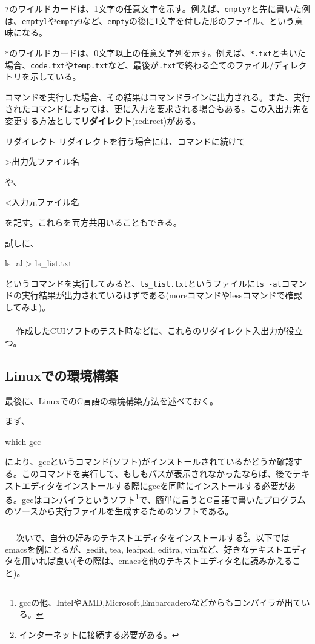 \verb|?|のワイルドカードは、1文字の任意文字を示す。例えば、\verb|empty?|と先に書いた例は、\verb|emptyl|や\verb|empty9|など、\verb|empty|の後に1文字を付した形のファイル、という意味になる。

\verb|*|のワイルドカードは、0文字以上の任意文字列を示す。例えば、\verb|*.txt|と書いた場合、\verb|code.txt|や\verb|temp.txt|など、最後が\verb|.txt|で終わる全てのファイル/ディレクトリを示している。

コマンドを実行した場合、その結果はコマンドラインに出力される。また、実行されたコマンドによっては、更に入力を要求される場合もある。この入出力先を変更する方法として\textbf{リダイレクト}(redirect)がある。
\begin{itembox}[l]{リダイレクト}
リダイレクトを行う場合には、コマンドに続けて
\begin{code}
>出力先ファイル名
\end{code}
や、
\begin{code}
<入力元ファイル名
\end{code}
を記す。これらを両方共用いることもできる。
\end{itembox}

試しに、
\begin{code}
ls -al > ls_list.txt
\end{code}
というコマンドを実行してみると、\verb|ls_list.txt|というファイルに\verb|ls -al|コマンドの実行結果が出力されているはずである(moreコマンドやlessコマンドで確認してみよ)。
\\ \\　
作成したCUIソフトのテスト時などに、これらのリダイレクト入出力が役立つ。

\subsection{Linuxでの環境構築}
最後に、LinuxでのC言語の環境構築方法を述べておく。

まず、
\begin{code}
which gcc
\end{code}
により、gccというコマンド(ソフト)がインストールされているかどうか確認する。このコマンドを実行して、もしもパスが表示されなかったならば、後でテキストエディタをインストールする際にgccを同時にインストールする必要がある。gccはコンパイラというソフト\footnote{gccの他、IntelやAMD,Microsoft,Embarcaderoなどからもコンパイラが出ている。}で、簡単に言うとC言語で書いたプログラムのソースから実行ファイルを生成するためのソフトである。
\\ \\　
次いで、自分の好みのテキストエディタをインストールする\footnote{インターネットに接続する必要がある。}。以下ではemacsを例にとるが、gedit, tea, leafpad, editra, vimなど、好きなテキストエディタを用いれば良い(その際は、emacsを他のテキストエディタ名に読みかえること)。

